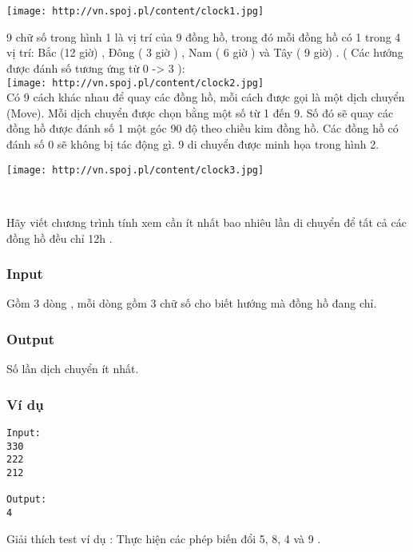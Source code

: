 

 

 


\texttt{[image: http://vn.spoj.pl/content/clock1.jpg]}

9 chữ số trong hình 1 là vị trí của 9 đồng hồ, trong đó mỗi đồng hồ có 1 trong 4 vị trí: Bắc (12 giờ) , Đông ( 3 giờ ) , Nam ( 6 giờ ) và Tây ( 9 giờ) . ( Các hướng được đánh số tương ứng từ 0 -> 3 ):
\\
\texttt{[image: http://vn.spoj.pl/content/clock2.jpg]}
\\Có 9 cách khác nhau để quay các đồng hồ, mỗi cách được gọi là một dịch chuyển (Move). Mỗi dịch chuyển được chọn bằng một số từ 1 đến 9. Số đó sẽ quay các đồng hồ được đánh số 1 một góc 90 độ theo chiều kim đồng hồ. Các đồng hồ có đánh số 0 sẽ không bị tác động gì. 9 di chuyển được minh họa trong hình 2.


\texttt{[image: http://vn.spoj.pl/content/clock3.jpg]}

 

Hãy viết chương trình tính xem cần ít nhất bao nhiêu lần di chuyển để tất cả các đồng hồ đều chỉ 12h .

\subsubsection{Input}

Gồm 3 dòng , mỗi dòng gồm 3 chữ số cho biết hướng mà đồng hồ đang chỉ.

\subsubsection{Output}

Số lần dịch chuyển ít nhất.

\subsubsection{Ví dụ}
\begin{verbatim}
Input:
330
222
212

Output:
4
\end{verbatim}

Giải thích test ví dụ : Thực hiện các phép biến đổi 5, 8, 4 và 9 .
